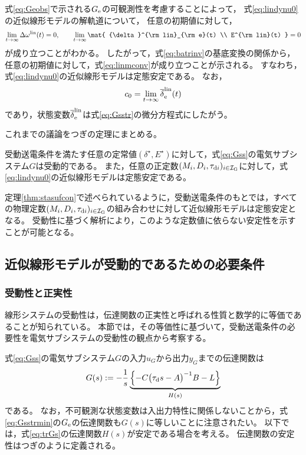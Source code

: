 \documentclass[tombow,dvipdfmx]{corona-a5-1.1}
\begin{document}
式\ref{eq:Geobs}で示される$G_{\rm e}$の可観測性を考慮することによって，
式\ref{eq:lindynu0}の近似線形モデルの解軌道について，
任意の初期値に対して，
\begin{align}\label{eq:allzero}
\lim_{t\rightarrow \infty} \Delta \omega^{\rm lin}(t)  =0,\qquad
\lim_{t\rightarrow \infty} \mat{
{\delta}^{\rm lin}_{\rm e}(t)   \\
E^{\rm lin}(t)  
}
 =0
\end{align}
が成り立つことがわかる。
したがって，式\ref{eq:batrinv}の基底変換の関係から，任意の初期値に対して，式\ref{eq:linmconv}が成り立つことが示される。
すなわち，式\ref{eq:lindynu0}の近似線形モデルは定態安定である。
なお，
\[
c_0 = \lim_{t\rightarrow \infty}\overline{\delta}^{\rm lin}_{\rm e}(t)
\]
であり，状態変数$\overline{\delta}^{\rm lin}_{\rm e}$は式\ref{eq:Gsstr}の微分方程式にしたがう。

これまでの議論をつぎの定理にまとめる。

\begin{定理}[受動性に基づく近似線形モデルの定態安定性]\label{thm:stasufcon}
受動送電条件を満たす任意の定常値$(\delta^{\star},E^{\star})$に対して，式\ref{eq:Gss}の電気サブシステム$G$は受動的である。
また，任意の正定数$(M_i,D_i,\tau_{{\rm d}i})_{i \in \mathcal{I}_{\rm G}}$に対して，式\ref{eq:lindynu0}の近似線形モデルは定態安定である。
\end{定理}

定理\ref{thm:stasufcon}で述べられているように，受動送電条件のもとでは，すべての物理定数$(M_i,D_i,\tau_{{\rm d}i})_{i \in \mathcal{I}_{\rm G}}$の組み合わせに対して近似線形モデルは定態安定となる。
受動性に基づく解析により，このような定数値に依らない安定性を示すことが可能となる。


\subsection{近似線形モデルが受動的であるための必要条件\advanced}\label{sec:nesconana}

\subsubsection{受動性と正実性}

線形システムの受動性は，伝達関数の正実性と呼ばれる性質と数学的に等価であることが知られている。
本節では，その等価性に基づいて，受動送電条件の必要性を電気サブシステムの受動性の観点から考察する。

式\ref{eq:Gss}の電気サブシステム$G$の入力$u_G$から出力$y_G$までの伝達関数は
\begin{align}\label{eq:trGs}
G(s) :=  - \frac{1}{s} 
\underbrace{
\left\{ -C \bigl( \tau_{\rm d} s -A \bigr)^{-1} B - L \right\}
}_{H(s)}
\end{align}
である。
なお，不可観測な状態変数は入出力特性に関係しないことから，式\ref{eq:Gsstrmin}の$G_{\rm e}$の伝達関数も$G(s)$に等しいことに注意されたい。
以下では，式\ref{eq:trGs}の伝達関数$H(s)$が安定である場合を考える。
伝達関数の安定性はつぎのように定義される。
\end{document}
